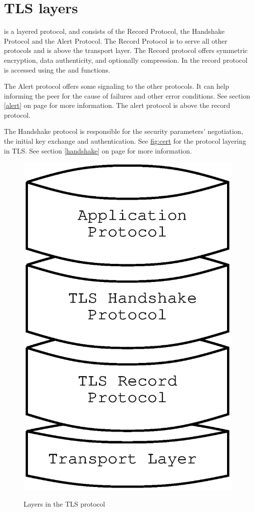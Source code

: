 \newpage
\section{TLS layers}

\tlsI{} is a layered protocol, and consists of the Record Protocol,
the Handshake Protocol and the Alert Protocol. The Record Protocol
is to serve all other protocols and is above the transport layer.
The Record protocol offers symmetric encryption, data authenticity, and
optionally compression.
In \gnutls{} the record protocol is accessed using the 
 and
functions.

\par
The Alert protocol offers some signaling to the other protocols. It can
help informing the peer for the cause of failures and other error
conditions. See section \ref{alert} on page \pageref{alert} for more information.
The alert protocol is above the record protocol.

\par 
The Handshake protocol is responsible for the security parameters'
negotiation, the initial key exchange and
authentication. See \hyperref{figure}{figure }{}{fig:cert} for the
protocol layering in TLS. 
See section \ref{handshake} on page \pageref{handshake} for more information.

\begin{figure}[hbtp]
\includegraphics{layers}
\label{fig:layers}
\caption{Layers in the TLS protocol}
\end{figure}


\addvspace{1.5cm}

